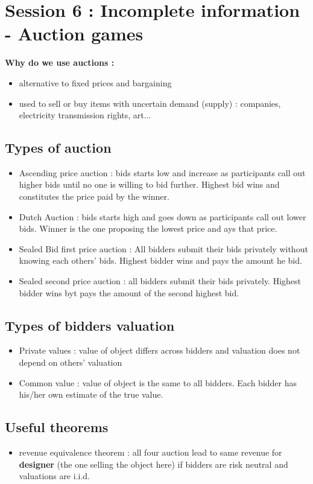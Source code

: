 \documentclass{article}
\begin{document}
\section{Session 6 : Incomplete information - Auction games}

\textbf{Why do we use auctions :}
\begin{itemize}
    \item alternative to fixed prices and bargaining
    \item used to sell or buy items with uncertain demand (supply) : companies, electricity transmission rights, art...
\end{itemize}

\subsection{Types of auction}
\begin{itemize}
    \item Ascending price auction : bids starts low and increase as participants call out higher bids until no one is willing to bid further. Highest bid wins and constitutes the price paid by the winner. 
    \item Dutch Auction : bids starts high and goes down as participants call out lower bids. Winner is the one proposing the lowest price and ays that price. 
    \item Sealed Bid first price auction : All bidders submit their bids privately without knowing each others' bids. Highest bidder wins and pays the amount he bid. 
    \item Sealed second price auction : all bidders submit their bids privately. Highest bidder wins byt pays the amount of the second highest bid.
\end{itemize}

\subsection{Types of bidders valuation}
\begin{itemize}
    \item Private values : value of object differs across bidders and valuation does not depend on others' valuation
    \item Common value : value of object is the same to all bidders. Each bidder has his/her own estimate of the true value. 
\end{itemize}

\subsection{Useful theorems}
\begin{itemize}
    \item revenue equivalence theorem : all four auction lead to same revenue for \textbf{designer} (the one selling the object here) if bidders are risk neutral and valuations are i.i.d.
\end{itemize}
\end{document}
